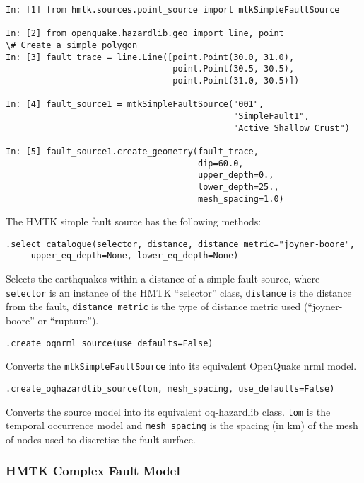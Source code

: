 \begin{Verbatim}[frame=single, commandchars=\\\{\}, fontsize=\scriptsize, samepage=true]
In: [1] from hmtk.sources.point_source import mtkSimpleFaultSource

In: [2] from openquake.hazardlib.geo import line, point
\# Create a simple polygon
In: [3] fault_trace = line.Line([point.Point(30.0, 31.0),
                                 point.Point(30.5, 30.5),
                                 point.Point(31.0, 30.5)]) 

In: [4] fault_source1 = mtkSimpleFaultSource("001",
                                             "SimpleFault1",
                                             "Active Shallow Crust")

In: [5] fault_source1.create_geometry(fault_trace, 
                                      dip=60.0,
                                      upper_depth=0.,
                                      lower_depth=25.,
                                      mesh_spacing=1.0)
\end{Verbatim}

The HMTK simple fault source has the following methods:

\verb;.select_catalogue(selector, distance, distance_metric="joyner-boore",;\\
\verb;     upper_eq_depth=None, lower_eq_depth=None);

Selects the earthquakes within a distance of a simple fault source, where \verb=selector= is an instance of the HMTK ``selector'' class, \verb=distance= is the distance from the fault, \verb=distance_metric= is the type of distance metric used (``joyner-boore'' or ``rupture''). 

\verb;.create_oqnrml_source(use_defaults=False);

Converts the \verb=mtkSimpleFaultSource= into its equivalent OpenQuake nrml model.

\verb;.create_oqhazardlib_source(tom, mesh_spacing, use_defaults=False);

Converts the source model into its equivalent oq-hazardlib class. \verb=tom= is the temporal occurrence model and \verb=mesh_spacing= is the spacing (in km) of the mesh of nodes used to discretise the fault surface.

\subsubsection{HMTK Complex Fault Model}

